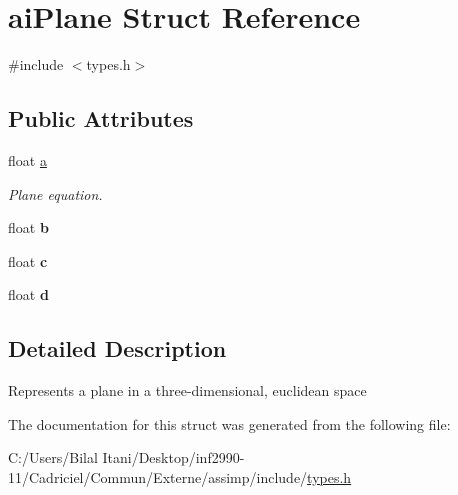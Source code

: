 \hypertarget{structai_plane}{}\section{ai\+Plane Struct Reference}
\label{structai_plane}


{\ttfamily \#include $<$types.\+h$>$}

\subsection*{Public Attributes}
\begin{DoxyCompactItemize}
\item 
float \hyperlink{structai_plane_aeadf64e70e6daf1f7f431c90cfc8bce1}{a}\hypertarget{structai_plane_aeadf64e70e6daf1f7f431c90cfc8bce1}{}\label{structai_plane_aeadf64e70e6daf1f7f431c90cfc8bce1}

\begin{DoxyCompactList}\small\item\em Plane equation. \end{DoxyCompactList}\item 
float {\bfseries b}\hypertarget{structai_plane_a84ab33cd9b2f5325282b489f8a2bf11c}{}\label{structai_plane_a84ab33cd9b2f5325282b489f8a2bf11c}

\item 
float {\bfseries c}\hypertarget{structai_plane_a7b0ea36c355ca003a5789088fb24da1f}{}\label{structai_plane_a7b0ea36c355ca003a5789088fb24da1f}

\item 
float {\bfseries d}\hypertarget{structai_plane_ab8696b583b6fab46ae30cd5b691e7c9a}{}\label{structai_plane_ab8696b583b6fab46ae30cd5b691e7c9a}

\end{DoxyCompactItemize}


\subsection{Detailed Description}
Represents a plane in a three-\/dimensional, euclidean space 

The documentation for this struct was generated from the following file\+:\begin{DoxyCompactItemize}
\item 
C\+:/\+Users/\+Bilal Itani/\+Desktop/inf2990-\/11/\+Cadriciel/\+Commun/\+Externe/assimp/include/\hyperlink{types_8h}{types.\+h}\end{DoxyCompactItemize}
